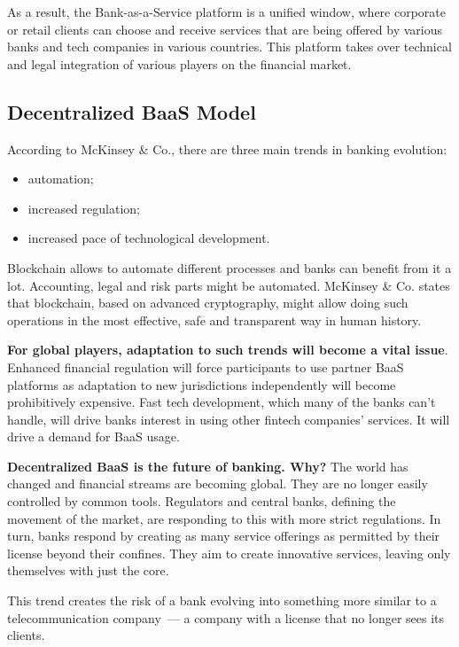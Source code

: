\documentclass{article}
\begin{document}
\begin{multicols}{2}
As a result, the Bank-as-a-Service platform is a unified window, where corporate or retail clients can choose and receive services that are being offered by various banks and tech companies in various countries. This platform takes over technical and legal integration of various players on the financial market.

\subsection{Decentralized BaaS Model}

According to McKinsey \& Co., there are three main trends in banking evolution:

\begin{itemize}
\item automation;
\item increased regulation;
\item increased pace of technological development.
\end{itemize}

Blockchain allows to automate different processes and banks can benefit from it a lot. Accounting, legal and risk parts might be automated. McKinsey \& Co. states that blockchain, based on advanced cryptography, might allow doing such operations in the most effective, safe and transparent way in human history.

\textbf{For global players, adaptation to such trends will become a vital issue}. Enhanced financial regulation will force participants  to use partner BaaS platforms as adaptation to new jurisdictions independently will become prohibitively expensive. Fast tech development,  which many of the banks can’t handle, will drive banks interest in using other fintech companies’ services. It will drive a demand for BaaS usage.

\textbf{Decentralized BaaS is the future of banking. Why?} The world has changed and financial streams are becoming global. They are no longer easily controlled by common tools. Regulators and central banks, defining the movement of the market, are responding to this with more strict regulations. In turn, banks respond by creating as many service offerings as permitted by their license beyond their confines. They aim to create innovative services, leaving only themselves with just the core.

This trend creates the risk of a bank evolving into something more similar to a telecommunication company~--- a company with a license that no longer sees its clients.


\end{multicols}
\end{document}

